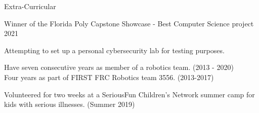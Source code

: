 \documentclass{resume} %
\begin{document}
\begin{rSection}{Extra-Curricular} \itemsep -3pt
	\item Winner of the Florida Poly Capstone Showcase - Best Computer Science project 2021
	\item Attempting to set up a personal cybersecurity lab for testing purposes.
	\item Have seven consecutive years as member of a robotics team. (2013 - 2020)\\
	Four years as part of FIRST FRC Robotics team 3556. (2013-2017)
	\item Volunteered for two weeks at a SeriousFun Children's Network summer camp for kids with serious illnesses. (Summer 2019)
\end{rSection}

\end{document}
